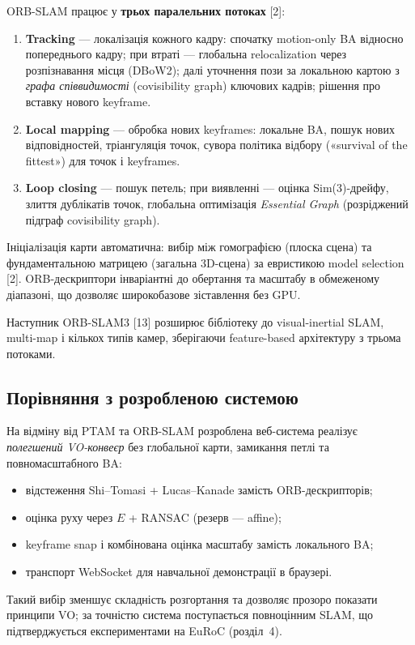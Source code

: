 \documentclass[14pt,a4paper,openany]{extreport}
\begin{document}
ORB-SLAM працює у \textbf{трьох паралельних потоках} [2]:
\begin{enumerate}[leftmargin=*]
  \item \textbf{Tracking} --- локалізація кожного кадру: спочатку motion-only BA відносно попереднього кадру; при втраті --- глобальна relocalization через розпізнавання місця (DBoW2); далі уточнення пози за локальною картою з \emph{графа співвидимості} (covisibility graph) ключових кадрів; рішення про вставку нового keyframe.
  \item \textbf{Local mapping} --- обробка нових keyframes: локальне BA, пошук нових відповідностей, тріангуляція точок, сувора політика відбору («survival of the fittest») для точок і keyframes.
  \item \textbf{Loop closing} --- пошук петель; при виявленні --- оцінка Sim(3)-дрейфу, злиття дублікатів точок, глобальна оптимізація \emph{Essential Graph} (розріджений підграф covisibility graph).
\end{enumerate}

Ініціалізація карти автоматична: вибір між гомографією (плоска сцена) та фундаментальною матрицею (загальна 3D-сцена) за евристикою model selection [2]. ORB-дескриптори інваріантні до обертання та масштабу в обмеженому діапазоні, що дозволяє широкобазове зіставлення без GPU.

Наступник ORB-SLAM3 [13] розширює бібліотеку до visual-inertial SLAM, multi-map і кількох типів камер, зберігаючи feature-based архітектуру з трьома потоками.

\subsection{Порівняння з розробленою системою}

На відміну від PTAM та ORB-SLAM розроблена веб-система реалізує \emph{полегшений VO-конвеєр} без глобальної карти, замикання петлі та повномасштабного BA:
\begin{itemize}[leftmargin=*]
  \item відстеження Shi--Tomasi + Lucas--Kanade замість ORB-дескрипторів;
  \item оцінка руху через $E$ + RANSAC (резерв --- affine);
  \item keyframe snap і комбінована оцінка масштабу замість локального BA;
  \item транспорт WebSocket для навчальної демонстрації в браузері.
\end{itemize}

Такий вибір зменшує складність розгортання та дозволяє прозоро показати принципи VO; за точністю система поступається повноцінним SLAM, що підтверджується експериментами на EuRoC (розділ~4).
\end{document}
